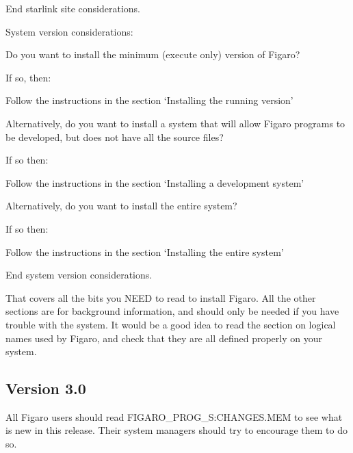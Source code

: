 End starlink site considerations.

System version considerations:
\begin{description}
	\item Do you want to install the minimum (execute only) version of
Figaro?
	\begin{description}
		\item If so, then:
		\begin{description}
			\item Follow the instructions in the section
`Installing the running version'
		\end{description}
	\end{description}
	\item Alternatively, do you want to install a system that will allow
Figaro programs to be developed, but does not have all the source files?
	\begin{description}
		\item If so then:
		\begin{description}
			\item Follow the instructions in the section
`Installing a development system'
		\end{description}
	\end{description}
	\item Alternatively, do you want to install the entire system?
	\begin{description}
		\item If so then:
		\begin{description}
			\item Follow the instructions in the section
`Installing the entire system'
		\end{description}
	\end{description}
\end{description}
End system version considerations.

That covers all the bits you NEED to read to install Figaro. All the other
sections are for background information, and should only be needed if you have
trouble with the system. It would be a good idea to read the section on
logical names used by Figaro, and check that they are all defined properly on
your system.

\subsection{Version 3.0}

All Figaro users should
read FIGARO\_PROG\_S:CHANGES.MEM to see what is new in this release.
Their system managers should try to encourage them to do so.

